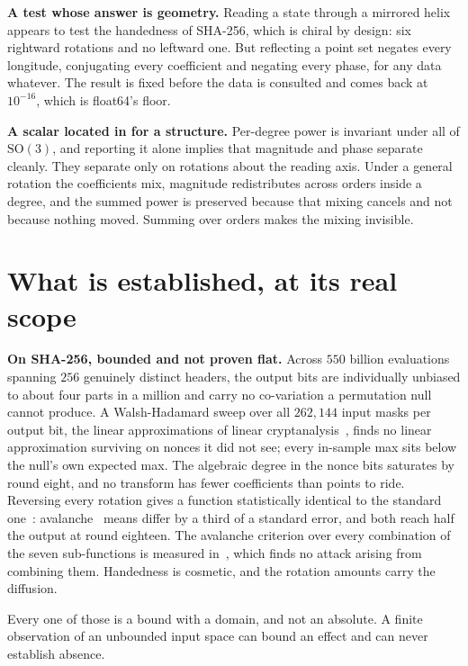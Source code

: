 \textbf{A test whose answer is geometry.} Reading a state through a mirrored helix appears to test the handedness of SHA-256, which is chiral by design: six rightward rotations and no leftward one. But reflecting a point set negates every longitude, conjugating every coefficient and negating every phase, for any data whatever. The result is fixed before the data is consulted and comes back at \(10^{-16}\), which is float64's floor.

\textbf{A scalar located in for a structure.} Per-degree power is invariant under all of \(\mathrm{SO}(3)\), and reporting it alone implies that magnitude and phase separate cleanly. They separate only on rotations about the reading axis. Under a general rotation the coefficients mix, magnitude redistributes across orders inside a degree, and the summed power is preserved because that mixing cancels and not because nothing moved. Summing over orders makes the mixing invisible.

\section{What is established, at its real scope}

\textbf{On SHA-256, bounded and not proven flat.} Across \(550\) billion evaluations spanning \(256\) genuinely distinct headers, the output bits are individually unbiased to about four parts in a million and carry no co-variation a permutation null cannot produce. A Walsh-Hadamard sweep over all \(262{,}144\) input masks per output bit, the linear approximations of linear cryptanalysis~\cite{src:Matsui-1994}, finds no linear approximation surviving on nonces it did not see; every in-sample max sits below the null's own expected max. The algebraic degree in the nonce bits saturates by round eight, and no transform has fewer coefficients than points to ride. Reversing every rotation gives a function statistically identical to the standard one~\cite{src:FIPS-180-4}: avalanche~\cite{src:Webster-and-Tavares-1986} means differ by a third of a standard error, and both reach half the output at round eighteen. The avalanche criterion over every combination of the seven sub-functions is measured in~\cite{src:Vaughn-and-Borowczak-2026}, which finds no attack arising from combining them. Handedness is cosmetic, and the rotation amounts carry the diffusion.

Every one of those is a bound with a domain, and not an absolute. A finite observation of an unbounded input space can bound an effect and can never establish absence.

